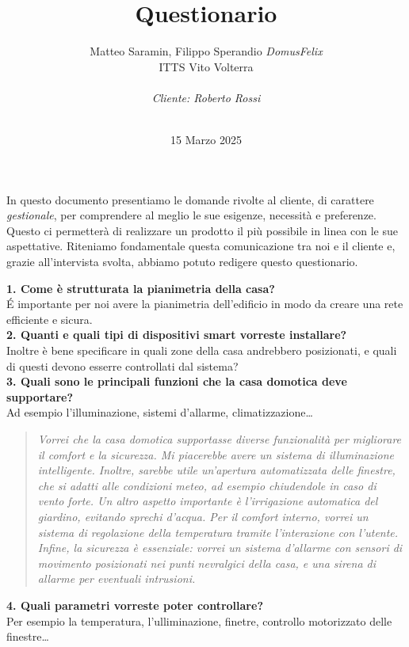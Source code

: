 \documentclass{exam}
\title{\huge{Questionario}}
\author{Matteo Saramin, Filippo Sperandio \textit{DomusFelix} \\ {\small ITTS Vito Volterra} \\ \\ \emph{Cliente: Roberto Rossi}}
\date{\version\\ 15 Marzo 2025}
\begin{document}
\maketitle
\vspace{5mm}
In questo documento presentiamo le domande rivolte al cliente, di carattere \emph{gestionale},
per comprendere al meglio le sue esigenze, necessità e preferenze. 
Questo ci permetterà di realizzare un prodotto il più possibile in linea con le sue aspettative. 
Riteniamo fondamentale questa comunicazione tra noi e il cliente e, grazie all'intervista svolta, abbiamo potuto redigere questo questionario.


\clearpage
\noindent\textbf{1. Come è strutturata la pianimetria della casa?}\\[1.5mm]
É importante per noi avere la pianimetria dell'edificio in modo da creare una rete efficiente e sicura.\\

\clearpage
\noindent\textbf{2. Quanti e quali tipi di dispositivi smart vorreste installare?}\\[1.5mm]
Inoltre è bene specificare in quali zone della casa andrebbero posizionati, e quali di questi devono esserre controllati dal sistema?\\

\clearpage
\noindent\textbf{3. Quali sono le principali funzioni che la casa domotica deve supportare?}\\[1.5mm]
Ad esempio l'illuminazione, sistemi d'allarme, climatizzazione\ldots\\[1.5mm]
\begin{quote}
\emph{Vorrei che la casa domotica supportasse diverse funzionalità per migliorare il comfort e la sicurezza. Mi piacerebbe avere un sistema di illuminazione intelligente. Inoltre, sarebbe utile un’apertura automatizzata delle finestre, che si adatti alle condizioni meteo, ad esempio chiudendole in caso di vento forte.
Un altro aspetto importante è l’irrigazione automatica del giardino, evitando sprechi d’acqua. Per il comfort interno, vorrei un sistema di regolazione della temperatura tramite l'interazione con l'utente. Infine, la sicurezza è essenziale: vorrei un sistema d’allarme con sensori di movimento posizionati nei punti nevralgici della casa, e una sirena di allarme per eventuali intrusioni.}\\
\end{quote}

\clearpage
\noindent\textbf{4. Quali parametri vorreste poter controllare?}\\[1.5mm]
Per esempio la temperatura, l'ulliminazione, finetre, controllo motorizzato delle finestre\ldots
\end{document}
